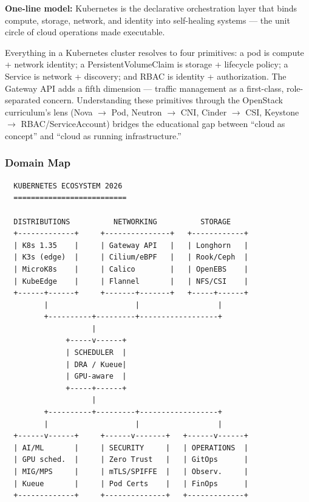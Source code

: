 \documentclass[11pt,letterpaper]{article}
\begin{document}
\begin{quotebox}
\textbf{One-line model:} Kubernetes is the declarative orchestration layer that binds compute, storage, network, and identity into self-healing systems --- the unit circle of cloud operations made executable.
\end{quotebox}

Everything in a Kubernetes cluster resolves to four primitives: a pod is compute + network identity; a PersistentVolumeClaim is storage + lifecycle policy; a Service is network + discovery; and RBAC is identity + authorization. The Gateway API adds a fifth dimension --- traffic management as a first-class, role-separated concern. Understanding these primitives through the OpenStack curriculum's lens (Nova $\rightarrow$ Pod, Neutron $\rightarrow$ CNI, Cinder $\rightarrow$ CSI, Keystone $\rightarrow$ RBAC/ServiceAccount) bridges the educational gap between ``cloud as concept'' and ``cloud as running infrastructure.''

\subsubsection{Domain Map}

\begin{asciibox}
\begin{verbatim}
  KUBERNETES ECOSYSTEM 2026
  ==========================

  DISTRIBUTIONS          NETWORKING          STORAGE
  +-------------+     +---------------+   +------------+
  | K8s 1.35    |     | Gateway API   |   | Longhorn   |
  | K3s (edge)  |     | Cilium/eBPF   |   | Rook/Ceph  |
  | MicroK8s    |     | Calico        |   | OpenEBS    |
  | KubeEdge    |     | Flannel       |   | NFS/CSI    |
  +------+------+     +-------+-------+   +-----+------+
         |                    |                  |
         +----------+---------+------------------+
                    |
              +-----v------+
              | SCHEDULER  |
              | DRA / Kueue|
              | GPU-aware  |
              +-----+------+
                    |
         +----------+---------+------------------+
         |                    |                  |
  +------v------+     +------v-------+   +------v------+
  | AI/ML       |     | SECURITY     |   | OPERATIONS  |
  | GPU sched.  |     | Zero Trust   |   | GitOps      |
  | MIG/MPS     |     | mTLS/SPIFFE  |   | Observ.     |
  | Kueue       |     | Pod Certs    |   | FinOps      |
  +-------------+     +--------------+   +-------------+
\end{verbatim}
\end{asciibox}
\end{document}
